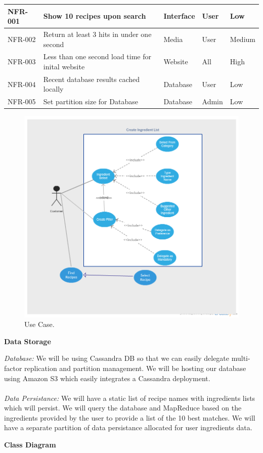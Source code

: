 \documentclass[12pt]{article}
\begin{document}
\begin{center}
\begin{tabular}{| l | l | l | l | l | }
  NFR-001 & Show 10 recipes upon search  &  Interface & User & Low  \\ \hline 
  NFR-002 & Return at least 3 hits in under one second & Media & User &  Medium\\ \hline
  NFR-003 & Less than one second load time for inital website &  Website & All & High \\ \hline
  NFR-004 & Recent database results cached locally & Database & User & Low \\ \hline
  NFR-005 & Set partition size for Database & Database & Admin & Low \\ \hline

\end{tabular}
\end{center}
\begin{center}
\begin{figure}
\includegraphics[width=\linewidth]{UseCase.png}
\caption{Use Case.}
\label{fig:UseCase}
\end{figure}
\end{center}
\newpage
\begin{center}
  \textbf{Data Storage}
\end{center}
\textit{Database: } We will be using Cassandra DB so that we can easily delegate multi-factor replication and partition management. We will be hosting our database using
Amazon S3 which easily integrates a Cassandra deployment. \\
\vspace{1cm} \\
\textit{Data Persistance: } We will have a static list of recipe names with ingredients lists which will persist. We will query the database and MapReduce based on the ingredients
provided by the user to provide a list of the 10 best matches. We will have a separate partition of data persistance allocated for user ingredients data. 

\newpage
\begin{center}
  \textbf{Class Diagram}
\end{center}
\end{document}
